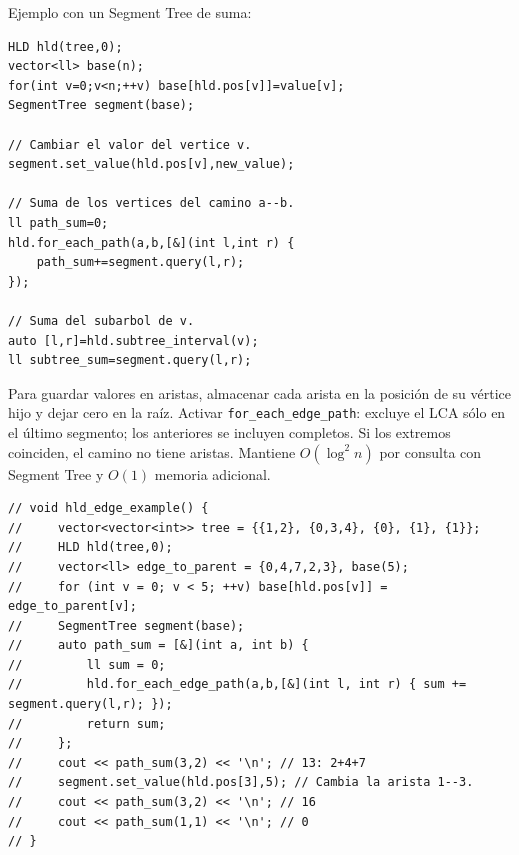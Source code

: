 Ejemplo con un Segment Tree de suma:

\begin{lstlisting}[style=cpp]
HLD hld(tree,0);
vector<ll> base(n);
for(int v=0;v<n;++v) base[hld.pos[v]]=value[v];
SegmentTree segment(base);

// Cambiar el valor del vertice v.
segment.set_value(hld.pos[v],new_value);

// Suma de los vertices del camino a--b.
ll path_sum=0;
hld.for_each_path(a,b,[&](int l,int r) {
    path_sum+=segment.query(l,r);
});

// Suma del subarbol de v.
auto [l,r]=hld.subtree_interval(v);
ll subtree_sum=segment.query(l,r);
\end{lstlisting}

Para guardar valores en aristas, almacenar cada arista en la posición de su
vértice hijo y dejar cero en la raíz. Activar \texttt{for\_each\_edge\_path}:
excluye el LCA sólo en el último segmento; los anteriores se incluyen completos.
Si los extremos coinciden, el camino no tiene aristas. Mantiene $O(\log^2 n)$
por consulta con Segment Tree y $O(1)$ memoria adicional.

\begin{lstlisting}[style=cpp]
// void hld_edge_example() {
//     vector<vector<int>> tree = {{1,2}, {0,3,4}, {0}, {1}, {1}};
//     HLD hld(tree,0);
//     vector<ll> edge_to_parent = {0,4,7,2,3}, base(5);
//     for (int v = 0; v < 5; ++v) base[hld.pos[v]] = edge_to_parent[v];
//     SegmentTree segment(base);
//     auto path_sum = [&](int a, int b) {
//         ll sum = 0;
//         hld.for_each_edge_path(a,b,[&](int l, int r) { sum += segment.query(l,r); });
//         return sum;
//     };
//     cout << path_sum(3,2) << '\n'; // 13: 2+4+7
//     segment.set_value(hld.pos[3],5); // Cambia la arista 1--3.
//     cout << path_sum(3,2) << '\n'; // 16
//     cout << path_sum(1,1) << '\n'; // 0
// }
\end{lstlisting}

